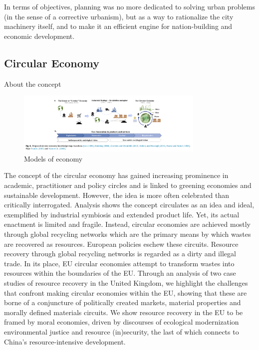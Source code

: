 In terms of objectives, planning was no more dedicated to solving urban problems (in the sense of a corrective urbanism), but as a way to rationalize the city machinery itself, and to make it an efficient engine for nation-building and economic development.  










\subsection{Circular Economy}


About the concept \parencite{Prieto-Sandoval2018}



\parencite{Yuan2006}

\begin{figure}[h!]
    \centering
    \includegraphics[width=0.8\textwidth]{sections/asset/model_strips.PNG}
    \caption{Models of economy}
    \label{fig:econ_models}
\end{figure}



\parencite{Gregson2015}
The concept of the circular economy has gained increasing prominence in academic, practitioner and policy circles and is linked to greening economies and sustainable development. However, the idea is more often celebrated than critically interrogated. Analysis shows the concept circulates as an idea and ideal, exemplified by industrial symbiosis and extended product life. Yet, its actual enactment is limited and fragile. Instead, circular economies are achieved mostly through global recycling networks which are the primary means by which wastes are recovered as resources. European policies eschew these circuits. Resource recovery through global recycling networks is regarded as a dirty and illegal trade. In its place, EU circular economies attempt to transform wastes into resources within the boundaries of the EU. Through an analysis of two case studies of resource recovery in the United Kingdom, we highlight the challenges that confront making circular economies within the EU, showing that these are borne of a conjuncture of politically created markets, material properties and morally defined materials circuits. We show resource recovery in the EU to be framed by moral economies, driven by discourses of ecological modernization environmental justice and resource (in)security, the last of which connects to China’s resource-intensive development.

